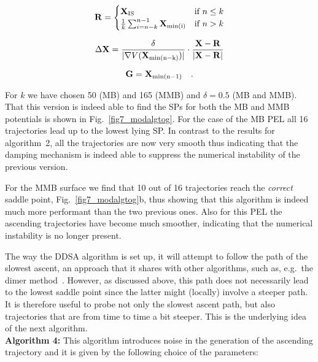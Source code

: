 \documentclass[aip,pre,twocolumn,reprint]{revtex4-1}
\begin{document}
\begin{equation}
   \mathbf{R}=
\begin{cases}
    \mathbf{X}_{\rm IS} & \text{if}~n\leq k \\
    \frac{1}{k} \sum_{i=n-k}^{n-1} \mathbf{X}_{\rm min(i)} & \text{if}~n>k
\end{cases}
\label{eq_17}
\end{equation}

\begin{equation} 
\Delta\mathbf{X}=\frac{\delta}{|\nabla V(\mathbf{X}_{\rm min(n-k)}) \vert} \cdot 
\frac{\mathbf{X}-\mathbf{R}}{\vert \mathbf{X}-\mathbf{R} \vert}
\label{eq_18}
\end{equation} 

\begin{equation} 
\mathbf{G}=\mathbf{X}_{\rm min(n-1)}  \quad.
\label{eq_19}
\end{equation} 

\noindent
For $k$ we have chosen 50 (MB) and 165 (MMB) and $\delta=0.5$ (MB
and MMB).  That this version is indeed able to find the SPs for both
the MB and MMB potentials is shown in Fig.~\ref{fig7_modalgtog}. For
the case of the MB PEL all 16 trajectories lead up to the lowest lying
SP. In contrast to the results for algorithm~2, all the trajectories
are now very smooth thus indicating that the damping mechanism is indeed
able to suppress the numerical instability of the previous version.

For the MMB surface we find that 10 out of 16 trajectories reach the {\it
correct} saddle point, Fig.~\ref{fig7_modalgtog}b, thus showing that
this algorithm is indeed much more performant than the two previous
ones. Also for this PEL the ascending trajectories have become much
smoother, indicating that the numerical instability is  no longer present.

The way the DDSA algorithm is set up, it will attempt to follow the path
of the slowest ascent, an approach that it shares with other algorithms,
such as, e.g.~the dimer method~\cite{henkelman1999dimer}. However, as discussed above,
this path does not necessarily lead to the lowest saddle point since the
latter might (locally) involve a steeper path. It is therefore useful
to probe not only the slowest ascent path, but also trajectories that
are from time to time a bit steeper. This is the underlying idea of the
next algorithm.\\

{\bf Algorithm 4:} This algorithm introduces noise in the generation
of the ascending trajectory and it is given by the following choice of
the parameters:
\end{document}
